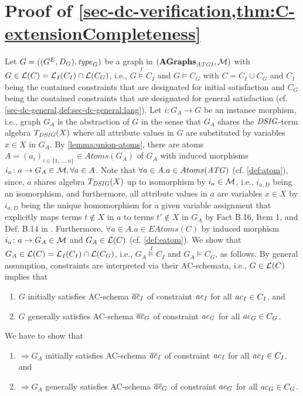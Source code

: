 \section{Proof of \cref{sec-dc-verification,thm:C-extensionCompleteness}}
\label{sec-proofs:thm:C-extensionCompleteness}
Let $G=((G^E,D_G),\mathit{type}_G)$ be a graph in $(\mathbf{AGraphs}_\mathit{ATGI},{\cal M})$ with $G \in \mathcal{L}(C)=\mathcal{L}_I(C_I) \cap \mathcal{L}(C_G)$, i.e., $G \stackrel{I}{\models} C_I$ and $G \models C_G$ with $C=C_I \cup C_G$ and $C_I$ being the contained constraints that are designated for initial satisfaction and $C_G$ being the contained constraints that are designated for general satisfaction (cf. \cref{sec-dc-general,def:sec-dc-general:lang}).
Let $i\colon G_A \to G$ be an instance morphism, i.e., graph $G_A$ is the abstraction of $G$ in the sense that $G_A$ shares the $\mathit{DSIG}$-term algebra $T_\mathit{DSIG}(X)$ where all attribute values in $G$ are substituted by variables $x \in X$ in $G_A$.
By \cref{lemma:union-atoms}, there are atoms $A=(a_i)_{i \in \{1,\ldots,n\}} \in Atoms(G_A)$ of $G_A$ with induced morphisms $i_a\colon a \to G_A \in {\cal M}, \forall a \in A$.
Note that $\forall a \in A.a \in Atoms(\mathit{ATG})$ (cf. \cref{def:atom}), since, $a$ shares algebra $T_\mathit{DSIG}(X)$ up to isomorphism by $i_a \in {\cal M}$, i.e., $i_{a,D}$ being an isomorphism, and furthermore, all attribute values in $a$ are variables $x \in X$ by $i_{a,D}$ being the unique homomorphism for a given variable assignment that explicitly maps terms $t \not\in X$ in $a$ to terms $t' \not\in X$ in $G_A$ by Fact B.16, Item 1, and Def. B.14 in \cite{Ehrig:2006:FAG:1121741}.
Furthermore, $\forall a \in A.a \in EAtoms(C)$ by induced morphism $i_a\colon a \to G_A \in {\cal M}$ and $G_A \in \mathcal{L}(C)$ (cf. \cref{def:eatom}).
We show that $G_A \in \mathcal{L}(C)=\mathcal{L}_I(C_I) \cap \mathcal{L}(C_G)$, i.e., $G_A \stackrel{I}{\models} C_I$ and $G_A \models C_G$, as follows.
By general assumption, constraints are interpreted via their AC-schemata, i.e., $G \in \mathcal{L}(C)$ implies that
\begin{enumerate}
  \item $G$ initially satisfies AC-schema $\overline{\mathit{ac}}_I$ of constraint $\mathit{ac}_I$ for all $\mathit{ac}_I \in C_I$, and
  \item $G$ generally satisfies AC-schema $\overline{\mathit{ac}}_G$ of constraint $\mathit{ac}_G$ for all $\mathit{ac}_G \in C_G$.
\end{enumerate}
We have to show that 
\begin{enumerate}
\item $\Rightarrow G_A$ initially satisfies AC-schema $\overline{\mathit{ac}}_I$ of constraint $\mathit{ac}_I$ for all $\mathit{ac}_I \in C_I$, and
\item $\Rightarrow G_A$ generally satisfies AC-schema $\overline{\mathit{ac}}_G$ of constraint $\mathit{ac}_G$ for all $\mathit{ac}_G \in C_G$.
\end{enumerate}
